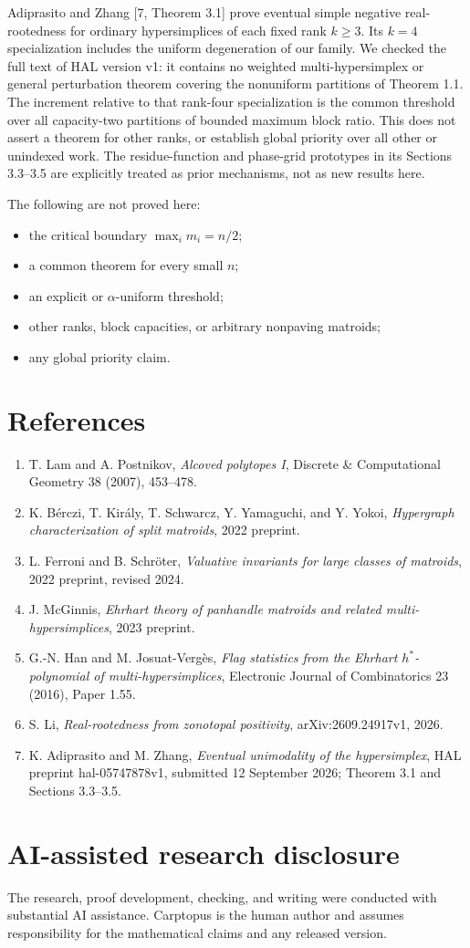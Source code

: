 \documentclass[11pt]{article}
\begin{document}
Adiprasito and Zhang [7, Theorem 3.1] prove eventual simple negative
real-rootedness for ordinary hypersimplices of each fixed rank $k\ge3$.
Its $k=4$ specialization includes the uniform degeneration of our family.
We checked the full text of HAL version v1: it contains no weighted
multi-hypersimplex or general perturbation theorem covering the nonuniform
partitions of Theorem 1.1.  The increment relative to that rank-four
specialization is the common threshold over all capacity-two partitions of
bounded maximum block ratio.  This does not assert a theorem for other
ranks, or establish global priority over all other or unindexed work.
The residue-function and phase-grid prototypes in its Sections 3.3--3.5
are explicitly treated as prior mechanisms, not as new results here.

The following are not proved here:

\begin{itemize}
\item the critical boundary $\max_i m_i=n/2$;
\item a common theorem for every small $n$;
\item an explicit or $\alpha$-uniform threshold;
\item other ranks, block capacities, or arbitrary nonpaving matroids;
\item any global priority claim.
\end{itemize}

\section*{References}
\begin{enumerate}


\item T. Lam and A. Postnikov, \emph{Alcoved polytopes I}, Discrete \& Computational Geometry 38 (2007), 453--478.
\item K. Bérczi, T. Király, T. Schwarcz, Y. Yamaguchi, and Y. Yokoi, \emph{Hypergraph characterization of split matroids}, 2022 preprint.
\item L. Ferroni and B. Schröter, \emph{Valuative invariants for large classes of matroids}, 2022 preprint, revised 2024.
\item J. McGinnis, \emph{Ehrhart theory of panhandle matroids and related multi-hypersimplices}, 2023 preprint.
\item G.-N. Han and M. Josuat-Vergès, \emph{Flag statistics from the Ehrhart $h^*$-polynomial of multi-hypersimplices}, Electronic Journal of Combinatorics 23 (2016), Paper 1.55.
\item S. Li, \emph{Real-rootedness from zonotopal positivity}, arXiv:2609.24917v1, 2026.
\item K. Adiprasito and M. Zhang, \emph{Eventual unimodality of the hypersimplex}, HAL preprint hal-05747878v1, submitted 12 September 2026; Theorem 3.1 and Sections 3.3--3.5.

\end{enumerate}

\section*{AI-assisted research disclosure}


The research, proof development, checking, and writing were conducted with
substantial AI assistance.  Carptopus is the human author and assumes responsibility
for the mathematical claims and any released version.
\end{document}
